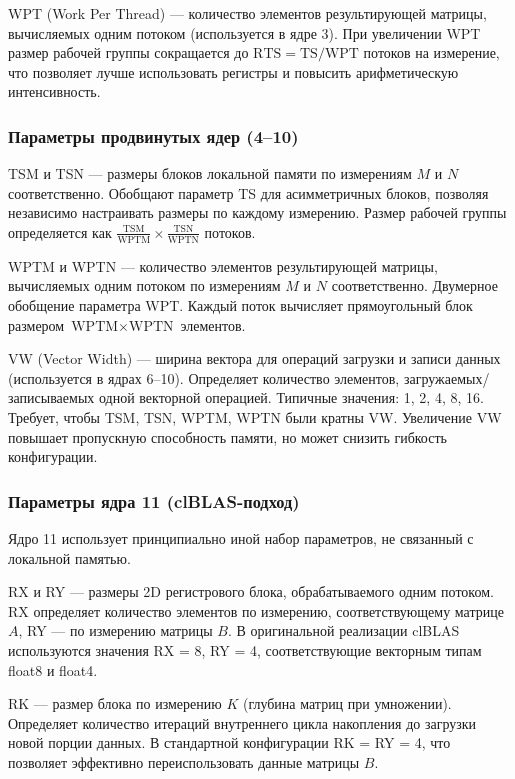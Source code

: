 WPT (Work Per Thread) --- количество элементов результирующей матрицы, вычисляемых одним потоком (используется в ядре 3). При увеличении WPT размер рабочей группы сокращается до $\text{RTS} = \text{TS}/\text{WPT}$ потоков на измерение, что позволяет лучше использовать регистры и повысить арифметическую интенсивность.

\subsubsection{Параметры продвинутых ядер (4--10)}

TSM и TSN --- размеры блоков локальной памяти по измерениям $M$ и $N$ соответственно. Обобщают параметр TS для асимметричных блоков, позволяя независимо настраивать размеры по каждому измерению. Размер рабочей группы определяется как $\frac{\text{TSM}}{\text{WPTM}} \times \frac{\text{TSN}}{\text{WPTN}}$ потоков.

WPTM и WPTN --- количество элементов результирующей матрицы, вычисляемых одним потоком по измерениям $M$ и $N$ соответственно. Двумерное обобщение параметра WPT. Каждый поток вычисляет прямоугольный блок размером $\text{WPTM} \times \text{WPTN}$ элементов.

VW (Vector Width) --- ширина вектора для операций загрузки и записи данных (используется в ядрах 6--10). Определяет количество элементов, загружаемых/записываемых одной векторной операцией. Типичные значения: 1, 2, 4, 8, 16. Требует, чтобы TSM, TSN, WPTM, WPTN были кратны VW. Увеличение VW повышает пропускную способность памяти, но может снизить гибкость конфигурации.

\subsubsection{Параметры ядра 11 (clBLAS-подход)}

Ядро 11 использует принципиально иной набор параметров, не связанный с локальной памятью.

RX и RY --- размеры 2D регистрового блока, обрабатываемого одним потоком. RX определяет количество элементов по измерению, соответствующему матрице $A$, RY --- по измерению матрицы $B$. В оригинальной реализации clBLAS используются значения RX = 8, RY = 4, соответствующие векторным типам float8 и float4.

RK --- размер блока по измерению $K$ (глубина матриц при умножении). Определяет количество итераций внутреннего цикла накопления до загрузки новой порции данных. В стандартной конфигурации RK = RY = 4, что позволяет эффективно переиспользовать данные матрицы $B$.

